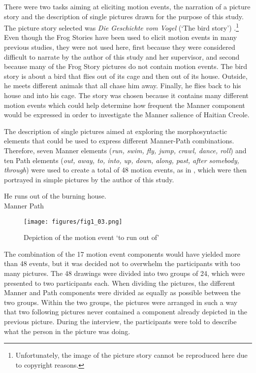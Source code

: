 \documentclass[output=paper,colorlinks,citecolor=brown]{langscibook}
\begin{document}
There were two tasks aiming at eliciting motion events, the narration of a picture story and the description of single pictures drawn for the purpose of this study. The picture story selected was \emph{Die Geschichte vom Vogel} (‘The bird story’) \citep[from][]{RettichRettich1972}.\footnote{Unfortunately, the image of the picture story cannot be reproduced here due to copyright reasons.} Even though the Frog Stories have been used to elicit motion events in many previous studies, they were not used here, first because they were considered difficult to narrate by the author of this study and her supervisor, and second because many of the Frog Story pictures do not contain motion events. The bird story is about a bird that flies out of its cage and then out of its house. Outside, he meets different animals that all chase him away. Finally, he flies back to his house and into his cage. The story was chosen because it contains many different motion events which could help determine how frequent the Manner component would be expressed in order to investigate the Manner salience of Haitian Creole.

The description of single pictures aimed at exploring the morphosyntactic elements that could be used to express different Manner-Path combinations. Therefore, seven Manner elements (\emph{run, swim, fly, jump, crawl, dance, roll}) and ten Path elements (\emph{out, away, to, into, up, down, along, past, after somebody, through}) were used to create a total of 48 motion events, as in , which were then portrayed in simple pictures by the author of this study.

\ea\label{ex:3:20}
\gll    He runs out {of the burning house.}\\
        {} Manner Path\\
\z

\begin{figure}
    \texttt{[image: figures/fig1\_03.png]}
    \caption{Depiction of the motion event ‘to run out of’}
    \label{fig:fig1_03}
\end{figure}

The combination of the 17 motion event components would have yielded more than 48 events, but it was decided not to overwhelm the participants with too many pictures. The 48 drawings were divided into two groups of 24, which were presented to two participants each. When dividing the pictures, the different Manner and Path components were divided as equally as possible between the two groups. Within the two groups, the pictures were arranged in such a way that two following pictures never contained a component already depicted in the previous picture. During the interview, the participants were told to describe what the person in the picture was doing.
\end{document}
